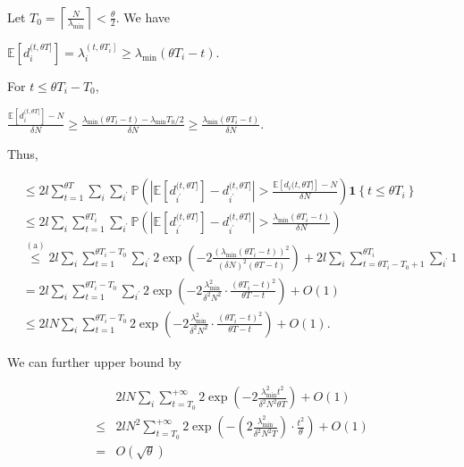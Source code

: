 Let $T_0=\left\lceil\frac{N}{\lambda_{\min}}\right\rceil<\frac{\theta}{2}$. We have 


$\mathbb{E}\left[d_{i}^{(t, \theta T]}\right]=\lambda_{i}^{\left(t, \theta T_{i}\right]} \geqslant \lambda_{\min}\left(\theta T_{i}- t\right)$.


For $t \leq \theta T_{i} - T_{0}$,

$\frac{\mathbb{E} [d_{i}^{(t, \theta T]}]- N}{\delta N} \geqslant \frac{\lambda_{\min}\left(\theta T_{i}-t\right)- \lambda_{\min} T_0 / 2}{\delta N} \geqslant \frac{\lambda_{\min}\left(\theta T_{i}-t\right)}{\delta N}$.


Thus, 


$$
\begin{aligned}
& \leqslant 2 l \sum_{t=1}^{\theta T} \sum_{i} \sum_{i^{\prime}} \mathbb{P}\left(\left|\mathbb{E}\left[d_{i^{\prime}}^{(t, \theta T]}\right]- d_{i^{\prime}}^{(t, \theta T]}\right|>\frac{\mathbb{E}\left[d_{i}(t, \theta T]\right]- N}{\delta N}\right) \bm{1}\left\{t \leqslant \theta T_{i}\right\} \\
& \leqslant 2 l \sum_{i} \sum_{t=1}^{\theta T_{i}} \sum_{i^{\prime}} \mathbb{P}\left(\left|\mathbb{E}\left[d_{i^{\prime}}^{(t, \theta T]}\right]-d_{i^{\prime}}^{(t, \theta T]}\right|> \frac{\lambda_{\min}\left(\theta T_{i}-t\right)}{\delta N}\right) \\
& \stackrel{(\mathrm{a})}{\leqslant} 2 l \sum_{i} \sum_{t=1}^{\theta T_{i}-T_0} \sum_{i^{\prime}} 2 \exp \left(- 2 \frac{\left(\lambda_{\min}\left(\theta T_{i}-t\right)\right)^2}{\left(\delta N\right)^2(\theta T-t)}\right)+ 2 l \sum_{i} \sum_{t=\theta T_{i}-T_0+1}^{\theta T_{i}} \sum_{i^{\prime}} 1 \\
& =2 l \sum_{i} \sum_{t=1}^{\theta T_{i}-T_0} \sum_{i^{\prime}} 2 \exp \left(-2 \frac{\lambda_{\min }^2}{\delta^2 N^2} \cdot \frac{\left(\theta T_{i}-t\right)^2}{\theta T-t}\right)+O(1) \\
& \leqslant 2 l N \sum_{i} \sum_{t=1}^{\theta T_{i}-T_0} 2 \exp \left(-2 \frac{\lambda_{\min}^2}{\delta^2 N^2} \cdot \frac{\left(\theta T_{i}-t \right)^2}{\theta T-t}\right)+O(1) .
\end{aligned}
$$

We can further upper bound by 

$$
\begin{aligned}
& 2 l N \sum_{i} \sum_{t=T_0}^{+\infty} 2 \exp \left(-2 \frac{\lambda_{\min}^2 t^2}{\delta^2 N^2 \theta T}\right) + O(1) \\
\leqslant & 2 l N^2 \sum_{t=T_0}^{+\infty} 2 \exp \left(-\left(2 \frac{\lambda_{\min}^2}{\delta^2 N^2 T}\right) \cdot \frac{t^2}{\theta}\right)+O(1) \\
= & O(\sqrt{\theta})
\end{aligned}
$$

